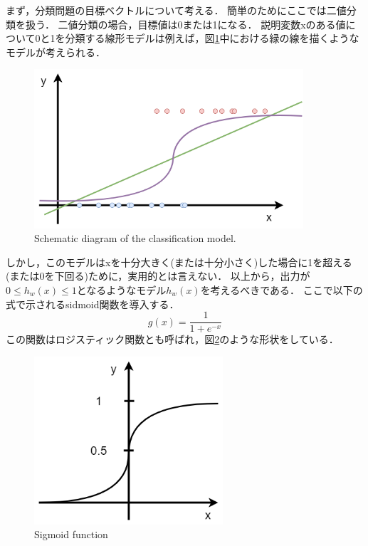     まず，分類問題の目標ベクトルについて考える．
    簡単のためにここでは二値分類を扱う．
    二値分類の場合，目標値は0または1になる．
    説明変数xのある値について0と1を分類する線形モデルは例えば，図\ref{2_classification}中における緑の線を描くようなモデルが考えられる．
    \begin{figure}[ht]
        \begin{center}
            \includegraphics[width=10.0cm]{./8_appendix/img/classification}
            \caption{Schematic diagram of the classification model.}
            \label{2_classification}
        \end{center}
    \end{figure}
    しかし，このモデルはxを十分大きく(または十分小さく)した場合に1を超える(または0を下回る)ために，実用的とは言えない．
    以上から，出力が$0\leq h_w(x) \leq 1$となるようなモデル$h_w(x)$を考えるべきである．
    ここで以下の式で示されるsidmoid関数を導入する．
    \begin{equation}
        g(x)=\frac{1}{1+e^{-x}}
    \end{equation}
    この関数はロジスティック関数とも呼ばれ，図\ref{2_sigmoid}のような形状をしている．
    \begin{figure}[ht]
        \begin{center}
            \includegraphics[width=7.0cm]{./8_appendix/img/sigmoid}
            \caption{Sigmoid function}
            \label{2_sigmoid}
        \end{center}
    \end{figure}
    
